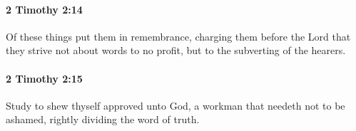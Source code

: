 		\paragraph{2 Timothy 2:14} %
			\label{2TIMOTHY-2-14}

			Of these things put them in remembrance, charging them before the Lord that they strive not about words to no profit, but to the subverting of the hearers.

			\begin{framed}
			\scriptsize
				\begin{compactdesc}
					\item[SBLG] 
				\end{compactdesc}
			\end{framed}

		\paragraph{2 Timothy 2:15} %
			\label{2TIMOTHY-2-15}

			Study to shew thyself approved unto God, a workman that needeth not to be ashamed, rightly dividing the word of truth.

